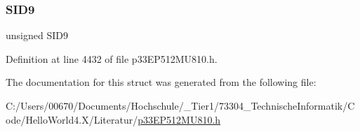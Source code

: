 \subsubsection{\texorpdfstring{S\+I\+D9}{SID9}}
{\footnotesize\ttfamily unsigned S\+I\+D9}



Definition at line 4432 of file p33\+E\+P512\+M\+U810.\+h.



The documentation for this struct was generated from the following file\+:\begin{DoxyCompactItemize}
\item 
C\+:/\+Users/00670/\+Documents/\+Hochschule/\+\_\+\+Tier1/73304\+\_\+\+Technische\+Informatik/\+Code/\+Hello\+World4.\+X/\+Literatur/\hyperlink{p33_e_p512_m_u810_8h}{p33\+E\+P512\+M\+U810.\+h}\end{DoxyCompactItemize}
